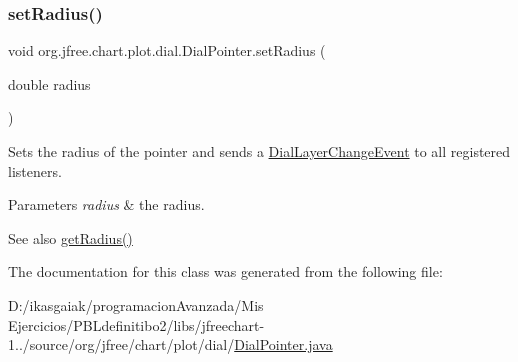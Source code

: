 \subsubsection{\texorpdfstring{set\+Radius()}{setRadius()}}
{\footnotesize\ttfamily void org.\+jfree.\+chart.\+plot.\+dial.\+Dial\+Pointer.\+set\+Radius (\begin{DoxyParamCaption}\item[{double}]{radius }\end{DoxyParamCaption})}

Sets the radius of the pointer and sends a \mbox{\hyperlink{classorg_1_1jfree_1_1chart_1_1plot_1_1dial_1_1_dial_layer_change_event}{Dial\+Layer\+Change\+Event}} to all registered listeners.


\begin{DoxyParams}{Parameters}
{\em radius} & the radius.\\
\hline
\end{DoxyParams}
\begin{DoxySeeAlso}{See also}
\mbox{\hyperlink{classorg_1_1jfree_1_1chart_1_1plot_1_1dial_1_1_dial_pointer_a1119de16d3da4dbef956eb3f8567ddb6}{get\+Radius()}} 
\end{DoxySeeAlso}


The documentation for this class was generated from the following file\+:\begin{DoxyCompactItemize}
\item 
D\+:/ikasgaiak/programacion\+Avanzada/\+Mis Ejercicios/\+P\+B\+Ldefinitibo2/libs/jfreechart-\/1../source/org/jfree/chart/plot/dial/\mbox{\hyperlink{_dial_pointer_8java}{Dial\+Pointer.\+java}}\end{DoxyCompactItemize}
